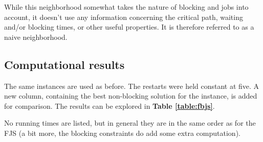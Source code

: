 \documentclass[a4paper,11pt]{article}
\begin{document}
While this neighborhood somewhat takes the nature of blocking and jobs into account, it doesn't use any information concerning the critical path, waiting and/or blocking times, or other useful properties. It is therefore referred to as a naive neighborhood.

\subsection{Computational results}

The same instances are used as before. The restarts were held constant at five. A new column, containing the best non-blocking solution for the instance, is added for comparison. The results can be explored in \textbf{Table \ref{table:fbjs}}.

No running times are listed, but in general they are in the same order as for the FJS (a bit more, the blocking constraints do add some extra computation).
\end{document}
